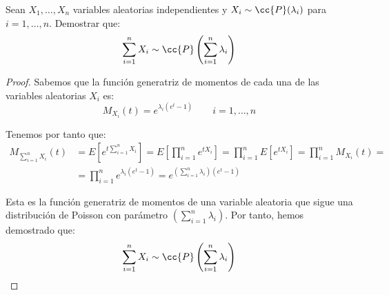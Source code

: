 \begin{ejercicio}
    Sean $X_1, \dots, X_n$ variables aleatorias independientes y $X_i\sim \cc{P}(\lambda_i)$ para $i=1,\dots,n$. Demostrar que:
    \begin{equation*}
        \sum_{i=1}^{n}X_i \sim \cc{P}\left(\sum_{i=1}^{n}\lambda_i\right)
    \end{equation*}
    \begin{proof}
        Sabemos que la función generatriz de momentos de cada una de las variables aleatorias $X_i$ es:
        \begin{equation*}
            M_{X_i}(t) = e^{\lambda_i(e^t-1)} \qquad i=1,\dots,n
        \end{equation*}

        Tenemos por tanto que:
        \begin{align*}
            M_{\sum\limits_{i=1}^{n}X_i}(t) &= E\left[e^{t\sum\limits_{i=1}^{n}X_i}\right] = E\left[\prod_{i=1}^{n}e^{tX_i}\right] = \prod_{i=1}^{n}E[e^{tX_i}] = \prod_{i=1}^{n}M_{X_i}(t) =\\
            &= \prod_{i=1}^{n}e^{\lambda_i(e^t-1)} = e^{\left(\sum\limits_{i=1}^{n}\lambda_i\right)(e^t-1)}
        \end{align*}

        Esta es la función generatriz de momentos de una variable aleatoria que sigue una distribución de Poisson con parámetro $\left(\sum\limits_{i=1}^{n}\lambda_i\right)$. Por tanto, hemos demostrado que:
        \begin{equation*}
            \sum_{i=1}^{n}X_i \sim \cc{P}\left(\sum_{i=1}^{n}\lambda_i\right)
        \end{equation*}
    \end{proof}
\end{ejercicio}


